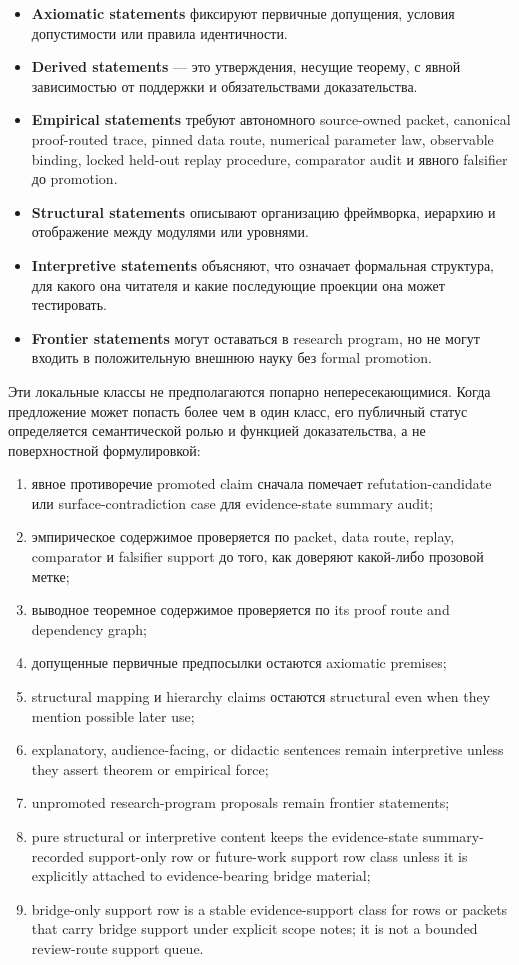 \begin{itemize}
\item \textbf{Axiomatic statements} фиксируют первичные допущения, условия
      допустимости или правила идентичности.
\item \textbf{Derived statements} — это утверждения, несущие теорему, с явной
      зависимостью от поддержки и обязательствами доказательства.
\item \textbf{Empirical statements} требуют автономного source-owned packet,
      canonical proof-routed trace, pinned data route, numerical parameter
      law, observable binding, locked held-out replay procedure, comparator
      audit и явного falsifier до promotion.
\item \textbf{Structural statements} описывают организацию фреймворка,
      иерархию и отображение между модулями или уровнями.
\item \textbf{Interpretive statements} объясняют, что означает формальная
      структура, для какого она читателя и какие последующие проекции она
      может тестировать.
\item \textbf{Frontier statements} могут оставаться в research program, но не
      могут входить в положительную внешнюю науку без formal promotion.
\end{itemize}
Эти локальные классы не предполагаются попарно непересекающимися. Когда
предложение может попасть более чем в один класс, его публичный статус
определяется семантической ролью и функцией доказательства, а не поверхностной
формулировкой:
\begin{enumerate}
\item явное противоречие promoted claim сначала помечает refutation-candidate
      или surface-contradiction case для evidence-state summary audit;
\item эмпирическое содержимое проверяется по packet, data route, replay,
      comparator и falsifier support до того, как доверяют какой-либо
      прозовой метке;
\item выводное теоремное содержимое проверяется по its proof route and
      dependency graph;
\item допущенные первичные предпосылки остаются axiomatic premises;
\item structural mapping и hierarchy claims остаются structural even when
      they mention possible later use;
\item explanatory, audience-facing, or didactic sentences remain interpretive
      unless they assert theorem or empirical force;
\item unpromoted research-program proposals remain frontier statements;
\item pure structural or interpretive content keeps the evidence-state summary-recorded
      support-only row or future-work support row class unless it is explicitly
      attached to evidence-bearing bridge material;
\item bridge-only support row is a stable evidence-support class for rows or
      packets that carry bridge support under explicit scope notes; it is not a
      bounded review-route support queue.
\end{enumerate}
